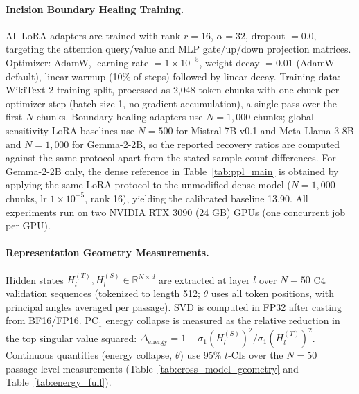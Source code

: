 \documentclass[pmlr,onecolumn]{jmlr}
\begin{document}
{\paragraph{Incision Boundary Healing Training.}
All LoRA adapters are trained with rank $r=16$, $\alpha=32$, dropout $= 0.0$, targeting the attention query/value and MLP gate/up/down projection matrices. Optimizer: AdamW, learning rate $= 1 \times 10^{-5}$, weight decay $= 0.01$ (AdamW default), linear warmup (10\% of steps) followed by linear decay. Training data: WikiText-2 training split, processed as 2,048-token chunks with one chunk per optimizer step (batch size 1, no gradient accumulation), a single pass over the first $N$ chunks. Boundary-healing adapters use $N=1{,}000$ chunks; global-sensitivity LoRA baselines use $N=500$ for Mistral-7B-v0.1 and Meta-Llama-3-8B and $N=1{,}000$ for Gemma-2-2B, so the reported recovery ratios are computed against the same protocol apart from the stated sample-count differences. For Gemma-2-2B only, the dense reference in Table~\ref{tab:ppl_main} is obtained by applying the same LoRA protocol to the unmodified dense model ($N=1{,}000$ chunks, lr $1\times10^{-5}$, rank 16), yielding the calibrated baseline 13.90. All experiments run on two NVIDIA RTX 3090 (24 GB) GPUs (one concurrent job per GPU).

\paragraph{Representation Geometry Measurements.}
Hidden states $H^{(T)}_l, H^{(S)}_l \in \mathbb{R}^{N \times d}$ are extracted at layer $l$ over $N=50$ C4 validation sequences (tokenized to length 512; $\theta$ uses all token positions, with principal angles averaged per passage). SVD is computed in FP32 after casting from BF16/FP16. PC$_1$ energy collapse is measured as the relative reduction in the top singular value squared: $\Delta_{\mathrm{energy}} = 1 - \sigma_1(H^{(S)}_l)^2 / \sigma_1(H^{(T)}_l)^2$. Continuous quantities (energy collapse, $\theta$) use 95\% $t$-CIs over the $N=50$ passage-level measurements (Table~\ref{tab:cross_model_geometry} and Table~\ref{tab:energy_full}).

}
\end{document}
